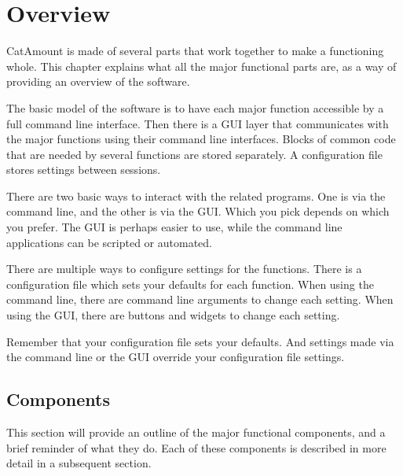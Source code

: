 \chapter{Overview}
\hypertarget{overview}{}

CatAmount is made of several parts that work together to make a
functioning whole. This chapter explains what all the major functional
parts are, as a way of providing an overview of the software.

The basic model of the software is to have each major function
accessible by a full command line interface. Then there is a GUI layer
that communicates with the major functions using their command line
interfaces. Blocks of common code that are needed by several functions
are stored separately. A configuration file stores settings between
sessions.

There are two basic ways to interact with the related programs.
One is via the command line, and the other is via the GUI. Which you
pick depends on which you prefer. The GUI is perhaps easier to use,
while the command line applications can be scripted or automated.

There are multiple ways to configure settings for the functions.
There is a configuration file which sets your defaults for each
function. When using the command line, there are command line
arguments to change each setting. When using the GUI, there are
buttons and widgets to change each setting.

Remember that your configuration file sets your defaults. And
settings made via the command line or the GUI override your
configuration file settings.


\section{Components}

This section will provide an outline of the major functional
components, and a brief reminder of what they do. Each of these
components is described in more detail in a subsequent section.

